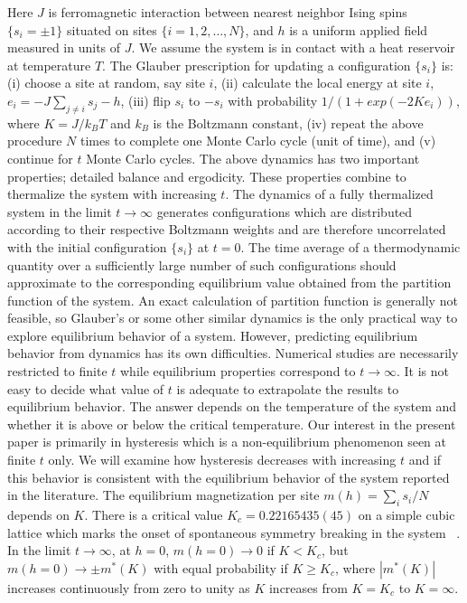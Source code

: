 \documentclass[a4,aps,amsmath,floatfix,nofootinbib,10pt]{revtex4}
\begin{document}
Here $J$ is ferromagnetic interaction between nearest neighbor Ising 
spins $\{s_i=\pm1\}$ situated on sites $\{i=1,2,\ldots,N\}$, and $h$ is 
a uniform applied field measured in units of $J$. We assume the system 
is in contact with a heat reservoir at temperature $T$. The Glauber 
prescription for updating a configuration $\{s_i\}$ is: (i) choose a 
site at random, say site $i$, (ii) calculate the local energy at site 
$i$, $e_i= -J \sum_{j \ne i} s_j -h$, (iii) flip $s_i$ to $-s_i$ with 
probability $1/(1+exp(-2Ke_i))$, where $K=J/k_BT$ and $k_B$ is the 
Boltzmann constant, (iv) repeat the above procedure $N$ times to 
complete one Monte Carlo cycle (unit of time), and (v) continue for $t$ 
Monte Carlo cycles. The above dynamics has two important properties; 
detailed balance and ergodicity. These properties combine to thermalize 
the system with increasing $t$. The dynamics of a fully thermalized 
system in the limit $t \to \infty$ generates configurations which are 
distributed according to their respective Boltzmann weights and are 
therefore uncorrelated with the initial configuration $\{s_i\}$ at 
$t=0$. The time average of a thermodynamic quantity over a sufficiently 
large number of such configurations should approximate to the 
corresponding equilibrium value obtained from the partition function of 
the system. An exact calculation of partition function is generally not 
feasible, so Glauber's or some other similar dynamics is the only 
practical way to explore equilibrium behavior of a system. However, 
predicting equilibrium behavior from dynamics has its own difficulties. 
Numerical studies are necessarily restricted to finite $t$ while 
equilibrium properties correspond to $t \to \infty$. It is not easy to 
decide what value of $t$ is adequate to extrapolate the results to 
equilibrium behavior. The answer depends on the temperature of the 
system and whether it is above or below the critical temperature. Our 
interest in the present paper is primarily in hysteresis which is a 
non-equilibrium phenomenon seen at finite $t$ only. We will examine how 
hysteresis decreases with increasing $t$ and if this behavior is 
consistent with the equilibrium behavior of the system reported in the 
literature. The equilibrium magnetization per site $m(h) = \sum_is_i/N$ 
depends on $K$. There is a critical value $K_c= 0.22165435(45)$ on a 
simple cubic lattice which marks the onset of spontaneous symmetry 
breaking in the system ~\cite{binder, sonsin, preis,gupta,haggkvist}. 
In the limit $t \to \infty$, at $h=0$, $m(h=0) \to 0$ if $K < K_c$, but 
$m(h=0) \to \pm m^*(K)$ with equal probability if $K \ge K_c$, where 
$|m^*(K)|$ increases continuously from zero to unity as $K$ increases 
from $K=K_c$ to $K=\infty$.
\end{document}
